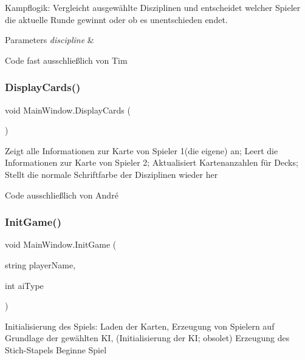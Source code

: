 Kampflogik\+: Vergleicht ausgewählte Disziplinen und entscheidet welcher Spieler die aktuelle Runde gewinnt oder ob es unentschieden endet. 


\begin{DoxyParams}{Parameters}
{\em discipline} & \\
\hline
\end{DoxyParams}


Code fast ausschließlich von Tim\mbox{\label{class_main_window_ac527beb2a3d814c60578bd415c589dcf}} 
\subsubsection{\texorpdfstring{Display\+Cards()}{DisplayCards()}}
{\footnotesize\ttfamily void Main\+Window.\+Display\+Cards (\begin{DoxyParamCaption}{ }\end{DoxyParamCaption})\hspace{0.3cm}{\ttfamily [inline]}}



Zeigt alle Informationen zur Karte von Spieler 1(die eigene) an; Leert die Informationen zur Karte von Spieler 2; Aktualisiert Kartenanzahlen für Decks; Stellt die normale Schriftfarbe der Disziplinen wieder her 

Code ausschließlich von André\mbox{\label{class_main_window_afcb02d6059de11622938a544e3eda66a}} 
\subsubsection{\texorpdfstring{Init\+Game()}{InitGame()}}
{\footnotesize\ttfamily void Main\+Window.\+Init\+Game (\begin{DoxyParamCaption}\item[{string}]{player\+Name,  }\item[{int}]{ai\+Type }\end{DoxyParamCaption})\hspace{0.3cm}{\ttfamily [inline]}}



Initialisierung des Spiels\+: Laden der Karten, Erzeugung von Spielern auf Grundlage der gewählten KI, (Initialisierung der KI; obsolet) Erzeugung des Stich-\/\+Stapels Beginne Spiel 


